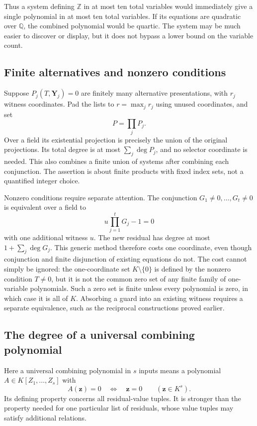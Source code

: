 Thus a system defining $\mathbb Z$ in at most ten total variables
would immediately give a single polynomial in at most ten total
variables.  If its equations are quadratic over $\mathbb Q$,
the combined polynomial would be quartic.  The system may be
much easier to discover or display, but it does not bypass a
lower bound on the variable count.

\subsection{Finite alternatives and nonzero conditions}

Suppose $P_j(T,\mathbf Y_j)=0$ are finitely many alternative
presentations, with $r_j$ witness coordinates.  Pad the lists to
$r=\max_jr_j$ using unused coordinates, and set
\[
                          P=\prod_j P_j.
\]
Over a field its existential projection is precisely the union
of the original projections.  Its total degree is at most
$\sum_j\deg P_j$, and no selector coordinate is needed.  This
also combines a finite union of systems after combining each
conjunction.  The assertion is about finite products with fixed
index sets, not a quantified integer choice.

Nonzero conditions require separate attention.  The conjunction
$G_1\ne0,\ldots,G_t\ne0$ is equivalent over a field to
\[
                         u\prod_{j=1}^tG_j-1=0
\]
with one additional witness $u$.  The new residual has degree at
most $1+\sum_j\deg G_j$.  This generic method therefore costs
one coordinate, even though conjunction and finite disjunction
of existing equations do not.  The cost cannot simply be ignored:
the one-coordinate set $K\setminus\{0\}$ is defined by the
nonzero condition $T\ne0$, but it is not the common zero set of
any finite family of one-variable polynomials.  Such a zero set
is finite unless every polynomial is zero, in which case it is
all of $K$.  Absorbing a guard into an existing witness requires
a separate equivalence, such as the reciprocal constructions
proved earlier.

\subsection{The degree of a universal combining polynomial}

Here a universal combining polynomial in $s$ inputs means a
polynomial $A\in K[Z_1,\ldots,Z_s]$ with
\[
              A(\mathbf z)=0\quad\Longleftrightarrow\quad
                           \mathbf z=0\qquad(\mathbf z\in K^s).
\]
Its defining property concerns all residual-value tuples.  It
is stronger than the property needed for one particular list
of residuals, whose value tuples may satisfy additional relations.

